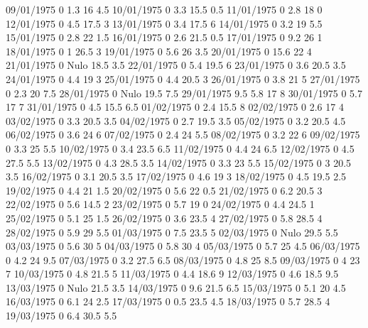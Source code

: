 09/01/1975  0      1.3    16     4.5 
10/01/1975  0      3.3    15.5   0.5 
11/01/1975  0      2.8    18     0 
12/01/1975  0      4.5    17.5   3 
13/01/1975  0      3.4    17.5   6 
14/01/1975  0      3.2    19     5.5 
15/01/1975  0      2.8    22     1.5 
16/01/1975  0      2.6    21.5   0.5 
17/01/1975  0      9.2    26     1 
18/01/1975  0      1      26.5   3 
19/01/1975  0      5.6    26     3.5 
20/01/1975  0      15.6   22     4 
21/01/1975  0     Nulo    18.5   3.5 
22/01/1975  0      5.4    19.5   6 
23/01/1975  0      3.6    20.5   3.5 
24/01/1975  0      4.4    19     3 
25/01/1975  0      4.4    20.5   3 
26/01/1975  0      3.8    21     5 
27/01/1975  0      2.3    20     7.5 
28/01/1975  0     Nulo    19.5   7.5 
29/01/1975  9.5    5.8    17     8 
30/01/1975  0      5.7    17     7 
31/01/1975  0      4.5    15.5   6.5 
01/02/1975  0      2.4    15.5   8 
02/02/1975  0      2.6    17     4 
03/02/1975  0      3.3    20.5   3.5 
04/02/1975  0      2.7    19.5   3.5 
05/02/1975  0      3.2    20.5   4.5 
06/02/1975  0      3.6    24     6 
07/02/1975  0      2.4    24     5.5 
08/02/1975  0      3.2    22     6 
09/02/1975  0      3.3    25     5.5 
10/02/1975  0      3.4    23.5   6.5 
11/02/1975  0      4.4    24     6.5 
12/02/1975  0      4.5    27.5   5.5 
13/02/1975  0      4.3    28.5   3.5 
14/02/1975  0      3.3    23     5.5 
15/02/1975  0      3      20.5   3.5 
16/02/1975  0      3.1    20.5   3.5 
17/02/1975  0      4.6    19     3 
18/02/1975  0      4.5    19.5   2.5 
19/02/1975  0      4.4    21     1.5 
20/02/1975  0      5.6    22     0.5 
21/02/1975  0      6.2    20.5   3 
22/02/1975  0      5.6    14.5   2 
23/02/1975  0      5.7    19     0 
24/02/1975  0      4.4    24.5   1 
25/02/1975  0      5.1    25     1.5 
26/02/1975  0      3.6    23.5   4 
27/02/1975  0      5.8    28.5   4 
28/02/1975  0      5.9    29     5.5 
01/03/1975  0      7.5    23.5   5 
02/03/1975  0     Nulo    29.5   5.5 
03/03/1975  0      5.6    30     5 
04/03/1975  0      5.8    30     4 
05/03/1975  0      5.7    25     4.5 
06/03/1975  0      4.2    24     9.5 
07/03/1975  0      3.2    27.5   6.5 
08/03/1975  0      4.8    25     8.5 
09/03/1975  0      4      23     7 
10/03/1975  0      4.8    21.5   5 
11/03/1975  0      4.4    18.6   9 
12/03/1975  0      4.6    18.5   9.5 
13/03/1975  0     Nulo    21.5   3.5 
14/03/1975  0      9.6    21.5   6.5 
15/03/1975  0      5.1    20     4.5 
16/03/1975  0      6.1    24     2.5 
17/03/1975  0      0.5    23.5   4.5 
18/03/1975  0      5.7    28.5   4 
19/03/1975  0      6.4    30.5   5.5 
